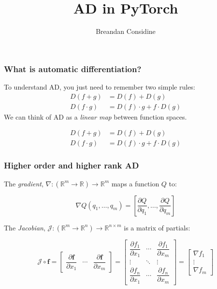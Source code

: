 \documentclass{beamer}
\title{AD in PyTorch}
\author{Breandan Considine}
\begin{document}
    \frame{\titlepage}


    \begin{frame}
        \frametitle{What is automatic differentiation?}
        To understand AD, you just need to remember two simple rules:
        \begin{align*}
            D(f + g) &= D(f) + D(g) \\
            D(f \cdot g) &= D(f) \cdot g + f \cdot D(g)
        \end{align*}
        We can think of AD as a \textit{linear map} between function spaces.

        \begin{align*}
            D(f + g) &= D(f) + D(g) \\
            D(f \cdot g) &= D(f) \cdot g + f \cdot D(g)
        \end{align*}
    \end{frame}


    \begin{frame}
        \frametitle{Higher order and higher rank AD}

        The \textit{gradient}, $\nabla: (\mathbb{R}^m\rightarrow\mathbb{R})\rightarrow\mathbb{R}^m$ maps a function $Q$ to:

        \begin{equation*}
            \nabla Q(q_1, \dots, q_m) = \left[ \frac{\partial Q}{\partial q_1}, \dots, \frac{\partial Q}{\partial q_m}\right]
        \end{equation*}

        The \textit{Jacobian}, $\mathcal{J}: (\mathbb{R}^m\rightarrow\mathbb{R}^n)\rightarrow\mathbb{R}^{n \times m}$ is a matrix of partials:

        \begin{equation*}
            \mathcal{J}\circ\mathbf{f} =
            \begin{bmatrix}
                \dfrac{\partial \mathbf{f}}{\partial x_1} & \cdots & \dfrac{\partial \mathbf{f}}{\partial x_m}
            \end{bmatrix} =
            \begin{bmatrix}
                \dfrac{\partial f_1}{\partial x_1} & \cdots & \dfrac{\partial f_1}{\partial x_m}\\
                \vdots & \ddots & \vdots\\
                \dfrac{\partial f_n}{\partial x_1} & \cdots & \dfrac{\partial f_n}{\partial x_m}
            \end{bmatrix} =
            \begin{bmatrix}
                \nabla f_1 \\
                \vdots \\
                \nabla f_m
            \end{bmatrix}
        \end{equation*}
    \end{frame}
\end{document}
